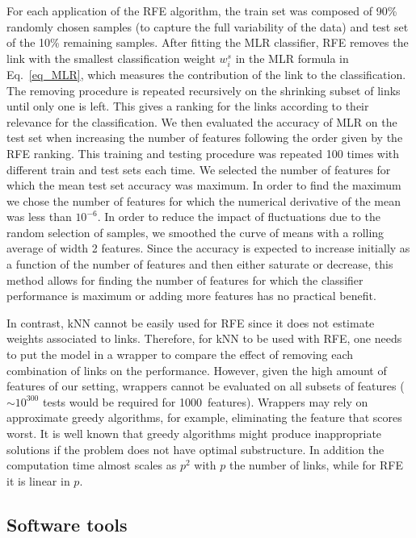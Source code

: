 \documentclass{article}
\begin{document}
For each application of the RFE algorithm, the train set was composed of 90\% randomly chosen samples (to capture the full variability of the data) and test set of the 10\% remaining samples. After fitting the MLR classifier, RFE removes the link with the smallest classification weight $w^s_i$ in the MLR formula in Eq.~\eqref{eq_MLR}, which measures the contribution of the link to the classification. The removing procedure is repeated recursively on the shrinking subset of links until only one is left. This gives a ranking for the links according to their relevance for the classification.
We then evaluated the accuracy of MLR on the test set when increasing the number of features following the order given by the RFE ranking. 
This training and testing procedure was repeated 100 times with different train and test sets each time. We selected the number of features for which the mean test set accuracy was maximum. In order to find the maximum we chose the number of features for which the numerical derivative of the mean was less than $10^{-6}$. In order to reduce the impact of fluctuations due to the random selection of samples, we smoothed the curve of means with a rolling average of width 2 features. Since the accuracy is expected to increase initially as a function of the number of features and then either saturate or decrease, this method allows for finding the number of features for which the classifier performance is maximum or adding more features has no practical benefit.

In contrast, kNN cannot be easily used for RFE since it does not estimate weights associated to links. Therefore, for kNN to be used with RFE, one needs to put the model in a wrapper to compare the effect of removing each combination of links on the performance. However, given the high amount of features of our setting, wrappers cannot be evaluated on all subsets of features ($\sim10^{300}$ tests would be required for 1000~features). Wrappers may rely on approximate greedy algorithms, for example, eliminating the feature that scores worst. It is well known that greedy algorithms might produce inappropriate solutions if the problem does not have optimal substructure. In addition the computation time almost scales as $p^2$ with $p$ the number of links, while for RFE it is linear in $p$.
  
  
\subsection{Software tools}
\end{document}
